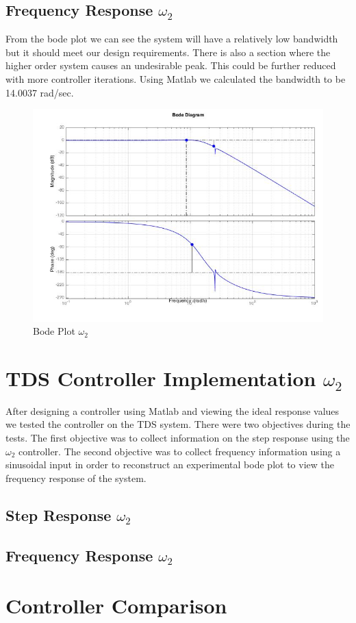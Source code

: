 \documentclass[11pt,titlepage]{article}
\begin{document}
	\subsection{Frequency Response $\omega_2$}
		From the bode plot we can see the system will have a relatively low bandwidth but it should meet our design requirements. There is also a section where the higher order system causes an undesirable peak. This could be further reduced with more controller iterations. Using Matlab we calculated the bandwidth to be 14.0037 rad/sec.
		\begin{figure}[H]
			\centering
			\includegraphics[scale=0.4]{bodew2}
			\caption{Bode Plot $\omega_2$}
		\end{figure}

\section{TDS Controller Implementation $\omega_2$}
	After designing a controller using Matlab and viewing the ideal response values we tested the controller on the TDS system. There were two objectives during the tests. The first objective was to collect information on the step response using the $\omega_2$ controller. The second objective was to collect frequency information using a sinusoidal input in order to reconstruct an experimental bode plot to view the frequency response of the system.

	\subsection{Step Response $\omega_2$}

	\subsection{Frequency Response $\omega_2$}

\section{Controller Comparison}
\end{document}
